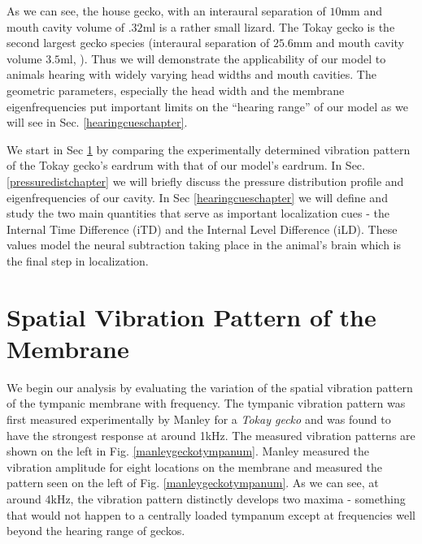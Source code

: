 As we can see, the house gecko, with an interaural separation of $10$mm and mouth cavity volume of $.32$ml is a rather
small lizard. The Tokay gecko is the second largest gecko species (interaural separation of $25.6$mm and mouth cavity volume $3.5$ml, \cite{dalsgaardtangcarr}).
Thus we will demonstrate the applicability of our model to animals hearing with widely varying head widths and mouth cavities. The geometric parameters, especially
the head width and the membrane eigenfrequencies put important limits on the ``hearing range'' of our model as we will see in Sec. \ref{hearingcueschapter}.

We start in Sec \ref{vibrationpatternchapter} by comparing the experimentally determined vibration pattern
of the Tokay gecko's eardrum with that of our model's eardrum. In Sec. \ref{pressuredistchapter} we will
briefly discuss the pressure distribution profile and eigenfrequencies of our cavity.
In Sec \ref{hearingcueschapter} we will define and study the two main quantities that serve as important localization
cues - the Internal Time Difference (iTD) and the Internal Level Difference (iLD). These values model the
neural subtraction taking place in the animal's brain which is the final step in localization.

\section{Spatial Vibration Pattern of the Membrane}\label{vibrationpatternchapter}
We begin our analysis by evaluating the variation of the spatial vibration pattern of the tympanic membrane
with frequency. The tympanic vibration pattern was first measured experimentally by Manley \cite{manleygecko1}
for a \textit{Tokay gecko} and was found to have the strongest response at around 1kHz. The measured vibration patterns
are shown on the left in Fig. \ref{manleygeckotympanum}. Manley measured the vibration amplitude for eight locations on the membrane and measured the pattern
seen on the left of Fig. \ref{manleygeckotympanum}. As we can see, at around $4$kHz, the vibration pattern
distinctly develops two maxima - something that would not happen to a centrally loaded tympanum except
at frequencies well beyond the hearing range of geckos.

